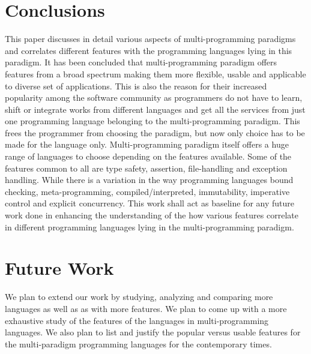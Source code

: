 \documentclass{sig-alternate}
\begin{document}
	\section{Conclusions}
	This paper discusses in detail various aspects of multi-programming paradigms and correlates different features with the programming languages lying in this paradigm. It has been concluded that multi-programming paradigm offers features from a broad spectrum making them more flexible, usable and applicable to diverse set of applications. This is also the reason for their increased popularity among the software community as programmers do not have to learn, shift or integrate works from different languages and get all the services from just one programming language belonging to the multi-programming paradigm. This frees the programmer from choosing the paradigm, but now only choice has to be made for the language only. Multi-programming paradigm itself offers a huge range of languages to choose depending on the features available. Some of the features common to all are type safety, assertion, file-handling and exception handling. While there is a variation in the way programming languages bound checking, meta-programming, compiled/interpreted, immutability, imperative control and explicit concurrency. This work shall act as baseline for any future work done in enhancing the understanding of the how various features correlate in different programming languages lying in the multi-programming paradigm.
	
	\section{Future Work}
	We plan to extend our work by studying, analyzing and comparing more languages as well as as with more features. We plan to come up with a more exhaustive study of the features of the languages in multi-programming languages. We also plan to list and justify the popular versus usable features for the multi-paradigm programming languages for the contemporary times. 
	





\end{document}
